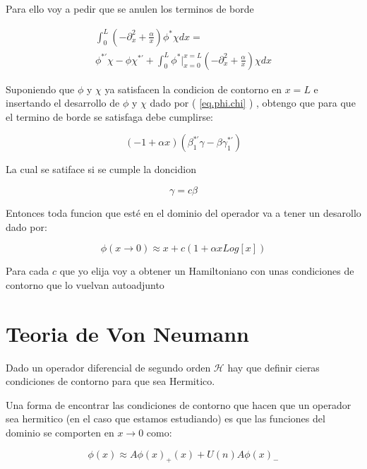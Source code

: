 Para ello voy a pedir que se anulen los terminos de borde

\begin{equation}
\begin{array}{c}
\int _0 ^{L} 
\left(
- \partial ^2 _x + \frac{\alpha}{x}
\right)
\phi ^{*} \chi dx = \\
\phi ^{*'} \chi - \phi \chi ^{* '} + 
\int _0 ^{L} 
\phi ^{*} 
| _{x=0} ^{x=L}
\left(
- \partial _x ^2 + \frac{\alpha}{x}
\right)
\chi dx 
\end{array}
\end{equation}

Suponiendo que $\phi $ y $ \chi $ ya satisfacen la condicion de contorno en $x=L$ e insertando el desarrollo de $\phi$ y $\chi$ dado por ( \ref{eq.phi.chi} ) , obtengo que para que el termino de borde se satisfaga debe cumplirse:

\begin{equation}
\left(
-1 + \alpha x 
\right)
\left(
\beta _1 ^{* '} \gamma - \beta \gamma _1 ^{* '}
\right)
\end{equation}

La cual se satiface si se cumple la doncidion 

\begin{equation}
\gamma = c \beta 
\end{equation}

Entonces toda funcion que esté en el dominio del operador va a tener un desarollo dado por:

\begin{equation}
\phi ( x \rightarrow 0 ) \approx x + c \left(  1 + \alpha x Log[x]   \right)
\end{equation}

Para cada $c$ que yo elija voy a obtener un Hamiltoniano con unas condiciones de contorno que lo vuelvan autoadjunto

\section{Teoria de Von Neumann}


Dado un operador diferencial de segundo orden $\mathscr{H}$ hay que definir cieras condiciones de contorno para que sea Hermitico.

Una forma de encontrar las condiciones de contorno que hacen que un operador sea hermitico (en el caso que estamos estudiando) es que las funciones del dominio se comporten en $x \rightarrow 0$ como:

\begin{equation}
\phi (x) \approx  A \phi (x) _{+} (x) + U(n) A \phi (x) _{-}
\end{equation}
 


